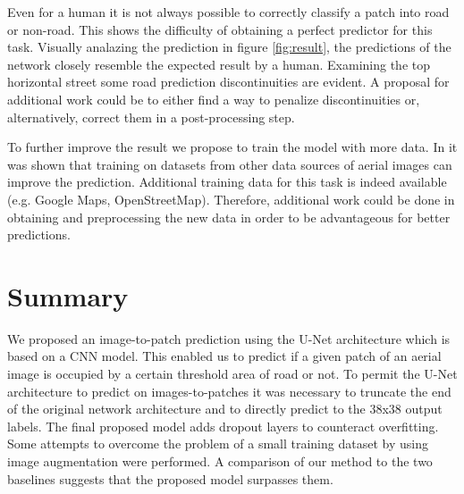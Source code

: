 \documentclass[10pt,conference,compsocconf]{IEEEtran}
\begin{document}
Even for a human it is not always possible to correctly classify a patch into road or non-road. This shows the difficulty of obtaining a perfect predictor for this task. Visually analazing the prediction in figure \ref{fig:result}, the predictions of the network closely resemble the expected result by a human. Examining the top horizontal street some road prediction discontinuities are evident. A proposal for additional work could be to either find a way to penalize discontinuities or, alternatively, correct them in a post-processing step.

To further improve the result we propose to train the model with more data. In \cite{Kaiser2017} it was shown that training on datasets from other data sources of aerial images can improve the prediction. Additional training data for this task is indeed available (e.g. Google Maps, OpenStreetMap). Therefore, additional work could be done in obtaining and preprocessing the new data in order to be advantageous for better predictions.

\section{Summary}

We proposed an image-to-patch prediction using the U-Net architecture which is based on a CNN model. This enabled us to predict if a given patch of an aerial image is occupied by a certain threshold area of road or not. To permit the U-Net architecture to predict on images-to-patches it was necessary to truncate the end of the original network architecture and to directly predict to the 38x38 output labels. The final proposed model adds dropout layers to counteract overfitting. Some attempts to overcome the problem of a small training dataset by using image augmentation were performed. A comparison of our method to the two baselines suggests that the proposed model surpasses them.





\end{document}

